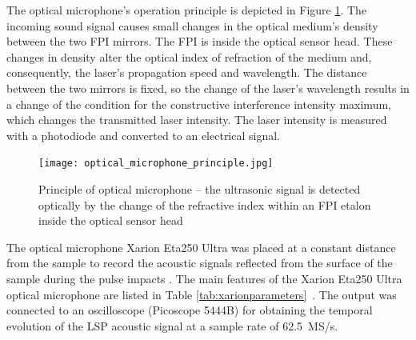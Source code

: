 \documentclass[sn-nature]{sn-jnl}%
\theoremstyle{thmstyleone}%
\theoremstyle{thmstyletwo}%
\theoremstyle{thmstylethree}%
\begin{document}
    The optical microphone's operation principle is depicted in Figure \ref{fig:optical_microphone_principle}. The incoming sound signal causes small changes in the optical medium's density between the two FPI mirrors. The FPI is inside the optical sensor head. These changes in density alter the optical index of refraction of the medium and, consequently, the laser’s propagation speed and wavelength. The distance between the two mirrors is fixed, so the change of the laser’s wavelength results in a change of the condition for the constructive interference intensity maximum, which changes the transmitted laser intensity. The laser intensity is measured with a photodiode and converted to an electrical signal.

    
    \begin{figure}[h!]
        \centering
        \texttt{[image: optical\_microphone\_principle.jpg]}
        \caption{Principle of optical microphone -- the ultrasonic signal is detected optically by the change of the refractive index within an FPI etalon inside the optical sensor head \cite{fischer_rohringer_panzer_hecker_2017}}
        \label{fig:optical_microphone_principle}
    \end{figure}

    The optical microphone Xarion Eta250 Ultra was placed at a constant distance from the sample to record the acoustic signals reflected from the surface of the sample during the pulse impacts \cite{banerjee_2019}. The main features of the Xarion Eta250 Ultra optical microphone are listed in Table \ref{tab:xarionparameters}~\cite{xarion_eta}. The output was connected to an oscilloscope (Picoscope 5444B) for obtaining the temporal evolution of the LSP acoustic signal at a sample rate of \SI[]{62.5}{\mega\siemens/\s}.

\end{document}
